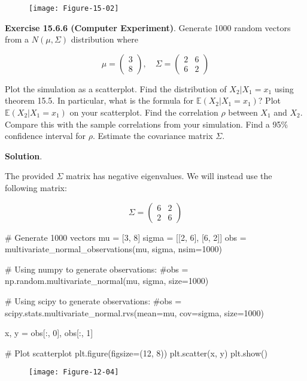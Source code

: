 \begin{figure}[H]
\texttt{[image: Figure-15-02]}
\end{figure}

\textbf{Exercise 15.6.6 (Computer Experiment)}. Generate 1000 random
vectors from a \(N(\mu, \Sigma)\) distribution where

\[ \mu = \begin{pmatrix} 3 \\ 8\end{pmatrix}
, \quad
\Sigma = \begin{pmatrix}
2 & 6 \\
6 & 2
\end{pmatrix}\]

Plot the simulation as a scatterplot. Find the distribution of
\(X_2 | X_1 = x_1\) using theorem 15.5. In particular, what is the
formula for \(\mathbb{E}(X_2 | X_1 = x_1)\)? Plot
\(\mathbb{E}(X_2 | X_1 = x_1)\) on your scatterplot. Find the
correlation \(\rho\) between \(X_1\) and \(X_2\). Compare this with the
sample correlations from your simulation. Find a 95\% confidence
interval for \(\rho\). Estimate the covariance matrix \(\Sigma\).

\textbf{Solution}.

The provided \(\Sigma\) matrix has negative eigenvalues. We will instead
use the following matrix:

\[ \Sigma = \begin{pmatrix} 6 & 2 \\ 2 & 6\end{pmatrix}\]

\begin{python}
# Generate 1000 vectors
mu = [3, 8]
sigma = [[2, 6], [6, 2]]
obs = multivariate_normal_observations(mu, sigma, nsim=1000)

# Using numpy to generate observations:
#obs = np.random.multivariate_normal(mu, sigma, size=1000)

# Using scipy to generate observations:
#obs = scipy.stats.multivariate_normal.rvs(mean=mu, cov=sigma, size=1000)

x, y = obs[:, 0], obs[:, 1]

# Plot scatterplot
plt.figure(figsize=(12, 8))
plt.scatter(x, y)
plt.show()
\end{python}

\begin{figure}[H]
\texttt{[image: Figure-12-04]}
\end{figure}

